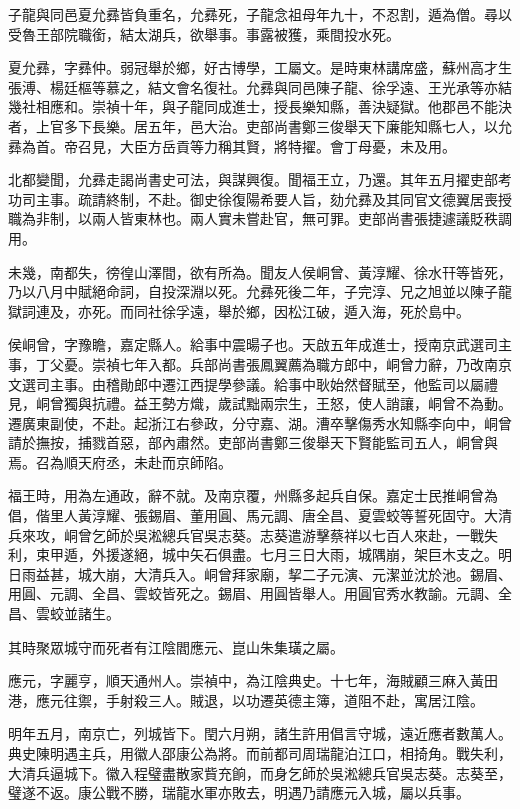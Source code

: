 \begin{pinyinscope}
{{子龍與同邑夏允彞皆負重名，允彞死，子龍念祖母年九十，不忍割，遁為僧。尋以受魯王部院職銜，結太湖兵，欲舉事。事露被獲，乘間投水死。

夏允彞，字彞仲。弱冠舉於鄉，好古博學，工屬文。是時東林講席盛，蘇州高才生張溥、楊廷樞等慕之，結文會名復社。允彞與同邑陳子龍、徐孚遠、王光承等亦結幾社相應和。崇禎十年，與子龍同成進士，授長樂知縣，善決疑獄。他郡邑不能決者，上官多下長樂。居五年，邑大治。吏部尚書鄭三俊舉天下廉能知縣七人，以允彞為首。帝召見，大臣方岳貢等力稱其賢，將特擢。會丁母憂，未及用。

北都變聞，允彞走謁尚書史可法，與謀興復。聞福王立，乃還。其年五月擢吏部考功司主事。疏請終制，不赴。御史徐復陽希要人旨，劾允彞及其同官文德翼居喪授職為非制，以兩人皆東林也。兩人實未嘗赴官，無可罪。吏部尚書張捷遽議貶秩調用。

未幾，南都失，徬徨山澤間，欲有所為。聞友人侯峒曾、黃淳耀、徐水幵等皆死，乃以八月中賦絕命詞，自投深淵以死。允彞死後二年，子完淳、兄之旭並以陳子龍獄詞連及，亦死。而同社徐孚遠，舉於鄉，因松江破，遁入海，死於島中。

侯峒曾，字豫瞻，嘉定縣人。給事中震暘子也。天啟五年成進士，授南京武選司主事，丁父憂。崇禎七年入都。兵部尚書張鳳翼薦為職方郎中，峒曾力辭，乃改南京文選司主事。由稽勛郎中遷江西提學參議。給事中耿始然督賦至，他監司以屬禮見，峒曾獨與抗禮。益王勢方熾，歲試黜兩宗生，王怒，使人誚讓，峒曾不為動。遷廣東副使，不赴。起浙江右參政，分守嘉、湖。漕卒擊傷秀水知縣李向中，峒曾請於撫按，捕戮首惡，部內肅然。吏部尚書鄭三俊舉天下賢能監司五人，峒曾與焉。召為順天府丞，未赴而京師陷。

福王時，用為左通政，辭不就。及南京覆，州縣多起兵自保。嘉定士民推峒曾為倡，偕里人黃淳耀、張錫眉、董用圓、馬元調、唐全昌、夏雲蛟等誓死固守。大清兵來攻，峒曾乞師於吳淞總兵官吳志葵。志葵遣游擊蔡祥以七百人來赴，一戰失利，束甲遁，外援遂絕，城中矢石俱盡。七月三日大雨，城隅崩，架巨木支之。明日雨益甚，城大崩，大清兵入。峒曾拜家廟，挈二子元演、元潔並沈於池。錫眉、用圓、元調、全昌、雲蛟皆死之。錫眉、用圓皆舉人。用圓官秀水教諭。元調、全昌、雲蛟並諸生。

其時聚眾城守而死者有江陰閻應元、崑山朱集璜之屬。

應元，字麗亨，順天通州人。崇禎中，為江陰典史。十七年，海賊顧三麻入黃田港，應元往禦，手射殺三人。賊退，以功遷英德主簿，道阻不赴，寓居江陰。

明年五月，南京亡，列城皆下。閏六月朔，諸生許用倡言守城，遠近應者數萬人。典史陳明遇主兵，用徽人邵康公為將。而前都司周瑞龍泊江口，相掎角。戰失利，大清兵逼城下。徽入程璧盡散家貲充餉，而身乞師於吳淞總兵官吳志葵。志葵至，璧遂不返。康公戰不勝，瑞龍水軍亦敗去，明遇乃請應元入城，屬以兵事。

}}
\end{pinyinscope}
